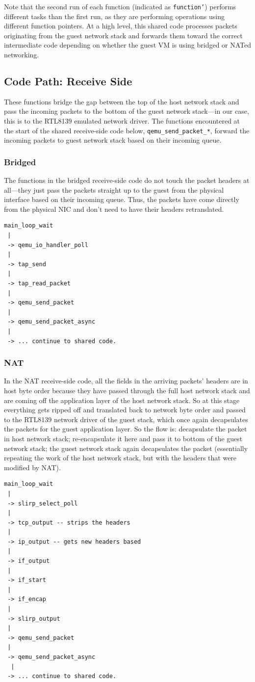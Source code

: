 \documentclass[letterpaper,twocolumn,11pt]{article}
\begin{document}
Note that the second run of each function (indicated as \texttt{function'}) performs different tasks than the first run, as they are performing operations using different function pointers. At a high level, this shared code processes packets originating from the guest network stack and forwards them toward the correct intermediate code depending on whether the guest VM is using bridged or NATed networking.

\subsection*{Code Path: Receive Side}
These functions bridge the gap between the top of the host network stack and pass the incoming packets to the bottom of the guest network stack---in our case, this is to the RTL8139 emulated network driver. The functions encountered at the start of the shared receive-side code below, \texttt{qemu\_send\_packet\_*}, forward the incoming packets to guest network stack based on their incoming queue.

\subsubsection*{Bridged}
The functions in the bridged receive-side code do not touch the packet headers at all---they just pass the packets straight up to the guest from the physical interface based on their incoming queue. Thus, the packets have come directly from the physical NIC and don't need to have their headers retranslated.

\begin{verbatim}
main_loop_wait
 |
 -> qemu_io_handler_poll
 |
 -> tap_send
 |
 -> tap_read_packet
 |
 -> qemu_send_packet
 |
 -> qemu_send_packet_async
 |
 -> ... continue to shared code. 
\end{verbatim}

\subsubsection*{NAT}
In the NAT receive-side code, all the fields in the arriving packets' headers are in host byte order because they have passed through the full host network stack and are coming off the application layer of the host network stack. So at this stage everything gets ripped off and translated back to network byte order and passed to the RTL8139 network driver of the guest stack, which once again decapsulates the packets for the guest application layer. So the flow is: decapsulate the packet in host network stack; re-encapsulate it here and pass it to bottom of the guest network stack; the guest network stack again decapsulates the packet (essentially repeating the work of the host network stack, but with the headers that were modified by NAT). 

\begin{verbatim}
main_loop_wait
 |
 -> slirp_select_poll
 |
 -> tcp_output -- strips the headers
 |
 -> ip_output -- gets new headers based 
 |
 -> if_output
 |
 -> if_start
 |
 -> if_encap
 |
 -> slirp_output
 |
 -> qemu_send_packet
 |
 -> qemu_send_packet_async
  |
 -> ... continue to shared code.
\end{verbatim}
\end{document}
